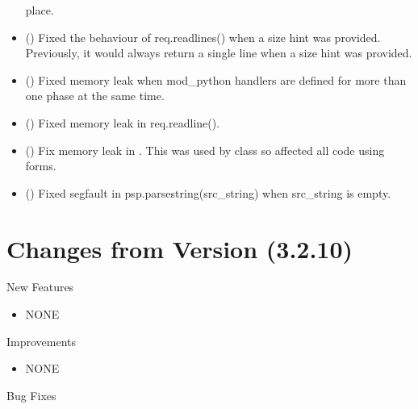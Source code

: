 \begin{itemize}
      place.
    \item
      ()
      Fixed the behaviour of req.readlines() when a size hint was provided. Previously,
      it would always return a single line when a size hint was provided.
    \item
      ()
      Fixed memory leak when mod_python handlers are defined for more than
      one phase at the same time.
    \item
      ()
      Fixed memory leak in req.readline().
    \item
      ()
      Fix memory leak in . This was used by
       class so affected all code using forms.
    \item
      ()
      Fixed segfault in psp.parsestring(src_string) when src_string is empty.
  \end{itemize}


\chapter{Changes from Version (3.2.10)\label{app-changes-from-3.2.10}}


  New Features

  \begin{itemize}
    \item
      NONE
  \end{itemize}

  Improvements

  \begin{itemize}
    \item
      NONE
  \end{itemize}

  Bug Fixes

